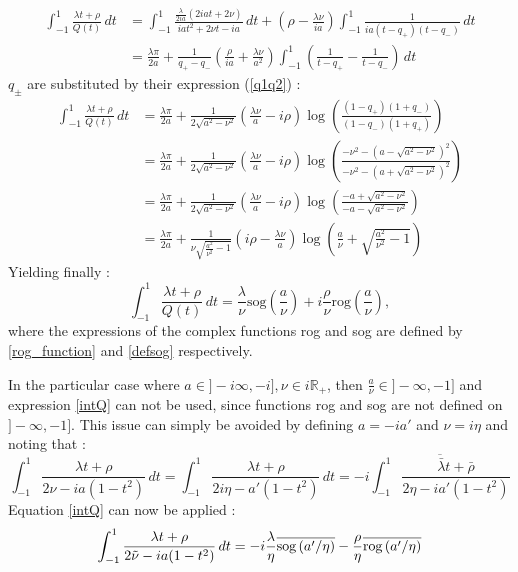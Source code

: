 \begin{equation*}
\begin{split}
\int_{-1}^1 \frac{\lambda t+ \rho}{Q(t)}\, dt&=\int_{-1}^1 \frac{\frac{\lambda}{2ia} (2iat+2\nu)}{iat^2+2\nu t-ia}\,dt+(\rho-\frac{\lambda \nu}{ia})\int_{-1}^1\frac{1}{ia(t-q_+)(t-q_-)}\,dt\\
&=\frac{\lambda\pi}{2a}+\frac{1}{q_+-q_-}\left(\frac{\rho}{ia}+\frac{\lambda\nu}{a^2}\right)\int_{-1}^1\left(\frac{1}{t-q_+}-\frac{1}{t-q_-}\right)\,dt
\end{split}
\end{equation*}
$q_\pm$ are substituted by their expression (\ref{q1q2}) :
\begin{equation*}
\begin{split}
\int_{-1}^1 \frac{\lambda t+ \rho}{Q(t)}\, dt&=\frac{\lambda\pi}{2a}+\frac{1}{2\sqrt{a^2-\nu^2}}\left(\frac{\lambda\nu}{a}-i\rho\right)\log\left(\frac{(1-q_+)(1+q_-)}{(1-q_-)(1+q_+)}\right)\\
&=\frac{\lambda\pi}{2a}+\frac{1}{2\sqrt{a^2-\nu^2}}\left(\frac{\lambda\nu}{a}-i\rho\right)\log\left(\frac{-\nu^2-(a-\sqrt{a^2-\nu^2})^2}{-\nu^2-(a+\sqrt{a^2-\nu^2})^2}\right)\\
&=\frac{\lambda\pi}{2a}+\frac{1}{2\sqrt{a^2-\nu^2}}\left(\frac{\lambda\nu}{a}-i\rho\right)\log\left(\frac{-a+\sqrt{a^2-\nu^2}}{-a-\sqrt{a^2-\nu^2}}\right)\\
&=\frac{\lambda\pi}{2a}+\frac{1}{\nu\sqrt{\frac{a^2}{\nu^2}-1}}\left(i\rho-\frac{\lambda\nu}{a}\right)\log\left(\frac{a}{\nu}+\sqrt{\frac{a^2}{\nu^2}-1}\right)
\end{split}
\end{equation*}
Yielding finally :
\begin{equation}
\int_{-1}^1 \frac{\lambda t+ \rho}{Q(t)}\, dt=\frac{\lambda}{\nu}\mbox{sog}(\frac{a}{\nu})+i\frac{\rho}{\nu}\mbox{rog}(\frac{a}{\nu}),
\label{intQ}
\end{equation}
where the expressions of the complex functions rog and sog are defined by \eqref{rog_function} and \eqref{defsog} respectively.

\begin{note}
\label{intQ_postcritical}
In the particular case where $a \in \rbrack -i\infty,-i\rbrack, \nu \in i\mathbb{R}_+$, then $\frac{a}{\nu} \in \rbrack -\infty,-1\rbrack$ and expression \eqref{intQ} can not be used, since functions rog and sog are not defined on $\rbrack -\infty,-1\rbrack$. This issue can simply be avoided by defining $a=-ia'$ and $\nu=i\eta$ and noting that :
\begin{equation}
    \int_{-1}^{1} \frac{\lambda t +\rho}{2\nu-ia(1-t^2)}\, dt=\int_{-1}^{1} \frac{\lambda t +\rho}{2i\eta-a'(1-t^2)}\, dt=-i\overline{\int_{-1}^{1} \frac{\bar{\lambda} t +\bar{\rho}}{2\eta-ia'(1-t^2)}}
\end{equation}
Equation \eqref{intQ} can now be applied :
\begin{equation}
    \int_{-1}^{1} \frac{\lambda t +\rho}{2\tilde{\nu}-ia(1-t^2)}\, dt=-i\frac{\lambda}{\eta}\overline{\mbox{sog}\left(a'/\eta\right)}-\frac{\rho}{\eta}\overline{\mbox{rog}\left(a'/\eta\right)}
\label{exprQ_postcr}
\end{equation}
\end{note}


